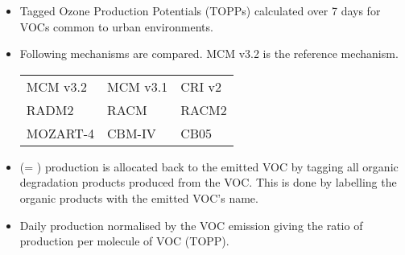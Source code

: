\begin{BlueBox}
    \vskip-1cm
    \begin{block}{}
        \begin{itemize} 
            \item Tagged Ozone Production Potentials (TOPPs) \cite{Butler:2011} calculated over 7 days for VOCs common to urban environments. \vspace{5mm}
            \item Following mechanisms are compared. MCM v3.2 is the reference mechanism.
                {
                     \normalsize
                    \begin{table}[htp]
                        \begin{center}
                            \begin{tabular}{P{7cm}P{7cm}P{7cm}}
                                MCM v3.2 & MCM v3.1 & CRI v2 \\
                                RADM2 & RACM & RACM2 \\
                                MOZART-4 & CBM-IV & CB05
                            \end{tabular}
                        \end{center}
                    \end{table}
                } \vspace{5mm}
            \item {} (= ) production is allocated back to the emitted VOC by tagging all organic degradation products produced from the VOC. This is done by labelling the organic products with the emitted VOC's name. \vspace{5mm}
            \item Daily  production normalised by the VOC emission giving the ratio of  production per molecule of VOC (TOPP).
        \end{itemize}
    \end{block}
\end{BlueBox}
